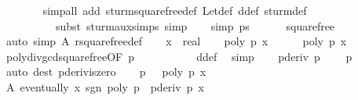 \begin{isabellebody}
\ \ \ \ \ \ \isamarkupfalse%
\ {\isacharparenleft}simp{\isacharunderscore}all\ add{\isacharcolon}\ sturm{\isacharunderscore}squarefree{\isacharprime}{\isacharunderscore}def\ Let{\isacharunderscore}def\ d{\isacharunderscore}def\ sturm{\isacharunderscore}def{\isacharcomma}\isanewline
\ \ \ \ \ \ \ \ \ \ subst\ sturm{\isacharunderscore}aux{\isachardot}simps{\isacharcomma}\ simp{\isacharparenright}\isanewline
\ \ \isamarkupfalse%
\ {\isacharbrackleft}simp{\isacharbrackright}{\isacharcolon}\ {\isachardoublequoteopen}{\isacharquery}ps{\isacharprime}\ {\isacharbang}\ {}\ {\isasymnoteq}\ {}{\isachardoublequoteclose}\ \isamarkupfalse%
\ squarefree\isanewline
\ \ \ \ \ \ \isamarkupfalse%
\ {\isacharparenleft}auto\ simp{\isacharcolon}\ A\ rsquarefree{\isacharunderscore}def{\isacharparenright}\isanewline
\isanewline
\ \ \isamarkupfalse%
\ x\ {\isacharcolon}{\isacharcolon}\ real\isanewline
\ \ \isamarkupfalse%
\ {\isachardoublequoteopen}poly\ {\isacharquery}p{\isacharprime}\ x\ {\isacharequal}\ {}{\isachardoublequoteclose}\isanewline
\ \ \isamarkupfalse%
\ {\isachardoublequoteopen}poly\ p\ x\ {\isacharequal}\ {}{\isachardoublequoteclose}\ \isamarkupfalse%
\ poly{\isacharunderscore}div{\isacharunderscore}gcd{\isacharunderscore}squarefree{\isacharparenleft}{}{\isacharparenright}{\isacharbrackleft}OF\ {\isacharbackquoteopen}p\ {\isasymnoteq}\ {}{\isacharbackquoteclose}{\isacharbrackright}\ \isanewline
\ \ \ \ \ \ \isamarkupfalse%
\ d{\isacharunderscore}def\ \isamarkupfalse%
\ simp\isanewline
\ \ \isamarkupfalse%
\ {\isachardoublequoteopen}pderiv\ p\ {\isasymnoteq}\ {}{\isachardoublequoteclose}\ \isamarkupfalse%
\ {\isacharbackquoteopen}p\ {\isasymnoteq}\ {}{\isacharbackquoteclose}\ \isamarkupfalse%
\ {\isacharparenleft}auto\ dest{\isacharcolon}\ pderiv{\isacharunderscore}iszero{\isacharparenright}\isanewline
\ \ \isamarkupfalse%
\ {\isacharbackquoteopen}p\ {\isasymnoteq}\ {}{\isacharbackquoteclose}\ {\isacharbackquoteopen}poly\ p\ x\ {\isacharequal}\ {}{\isacharbackquoteclose}\isanewline
\ \ \ \ \ \ \isamarkupfalse%
\ A{\isacharcolon}\ {\isachardoublequoteopen}eventually\ {\isacharparenleft}{\isasymlambda}x{\isachardot}\ sgn\ {\isacharparenleft}poly\ {\isacharparenleft}p\ {\isacharasterisk}\ pderiv\ p{\isacharparenright}\ x{\isacharparenright}\ {\isacharequal}\ \isanewline

\end{isabellebody}
